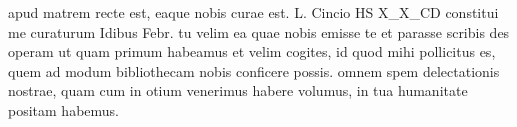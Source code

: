 


 apud matrem recte est, eaque nobis curae est. L. Cincio HS X_X_CD constitui me curaturum Idibus Febr. tu velim ea quae nobis emisse te et parasse scribis des operam ut quam primum habeamus et velim cogites, id quod mihi pollicitus es, quem ad modum bibliothecam nobis conficere possis. omnem spem delectationis nostrae, quam cum in otium venerimus habere volumus, in tua humanitate positam habemus.
